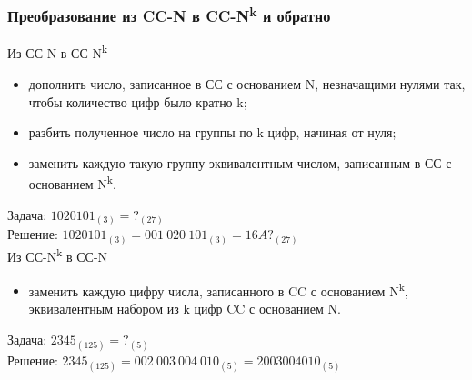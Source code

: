 \documentclass[t, 10pt, handout, aspectratio=169]{beamer}
\begin{document}
\begin{frame}
  \frametitle{Преобразование из CC-N в CC-N\textsuperscript{k} и обратно}
  {\large{Из СС-N в СС-N\textsuperscript{k}}}
  \vspace{-2pt}
  \begin{itemize}%
      \item дополнить число, записанное в СС с основанием N, незначащими нулями так, чтобы количество цифр было кратно k;
      \item разбить полученное число на группы по k цифр, начиная от нуля;
      \item заменить каждую такую группу эквивалентным числом, записанным в СС с основанием N\textsuperscript{k}.
  \end{itemize}
  Задача: $1020101_{(3)} = ?_{(27)}$ \\
  Решение: $1020101_{(3)} = 001\ 020\ 101_{(3)} = 16A?_{(27)}$ \\[0.3cm]
  {\large{Из СС-N\textsuperscript{k} в СС-N}}
  \vspace{-2pt}
  \begin{itemize}%
      \item заменить каждую цифру числа, записанного в CC с основанием N\textsuperscript{k}, эквивалентным набором из k цифр CC с основанием N.
  \end{itemize}
  Задача: $2345_{(125)} = ?_{(5)}$ \\
  Решение: $2345_{(125)} = 002\ 003\ 004\ 010_{(5)} = 2003004010_{(5)}$
\end{frame}
\end{document}
